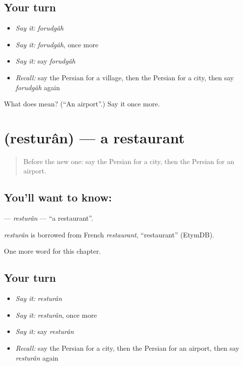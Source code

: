 \subsection*{Your turn}
\begin{itemize}
\raggedright
  \item \emph{Say it:} \emph{forudgâh}
  \item \emph{Say it:} \emph{forudgâh}, once more
  \item \emph{Say it:} say \emph{forudgâh}
  \item \emph{Recall:} say the Persian for a village, then the Persian for a city, then say \emph{forudgâh} again
\end{itemize}

\begin{tcolorbox}[breakable,colback=teal!4,colframe=teal!35!black,title={Before you move on}]
What does  mean? (\textquotedblleft{}An airport\textquotedblright{}.) Say it once more.
\end{tcolorbox}
\section[\texorpdfstring{\fa{رستوران} (resturân)}{رستوران (resturân)}]{ (resturân) — a restaurant}

\label{lesson:FA-C73-resturan}



\begin{quote}
Before the new one: say the Persian for a city, then the Persian for an airport.
\end{quote}

\subsection*{You'll want to know: }
\textbf{} — \emph{resturân} — \textquotedblleft{}a restaurant\textquotedblright{}.

\begin{cousinweb}
\emph{resturân} is borrowed from French \emph{restaurant}, \textquotedblleft{}restaurant\textquotedblright{} (EtymDB).
\end{cousinweb}

\begin{grammarlens}[title={What you've built}]
One more word for this chapter.
\end{grammarlens}

\subsection*{Your turn}
\begin{itemize}
\raggedright
  \item \emph{Say it:} \emph{resturân}
  \item \emph{Say it:} \emph{resturân}, once more
  \item \emph{Say it:} say \emph{resturân}
  \item \emph{Recall:} say the Persian for a city, then the Persian for an airport, then say \emph{resturân} again
\end{itemize}


